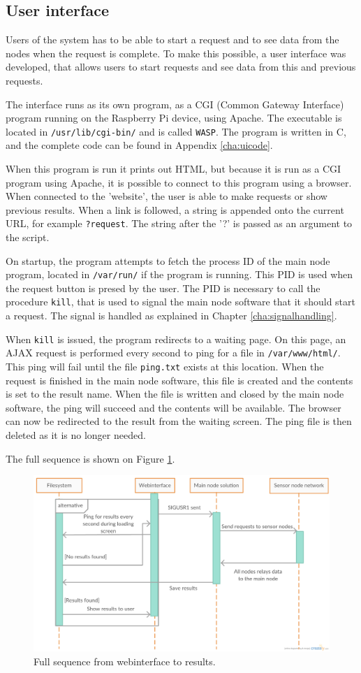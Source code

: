 \subsection{User interface} \label{cha:webinterface}
Users of the system has to be able to start a request and to see data from the nodes when the request is complete. To make this possible, a user interface was developed, that allows users to start requests and see data from this and previous requests.

The interface runs as its own program, as a CGI (Common Gateway Interface) program running on the Raspberry Pi device, using Apache. The executable is located in \texttt{/usr/lib/cgi-bin/} and is called \texttt{WASP}. The program is written in C, and the complete code can be found in Appendix \ref{cha:uicode}.

When this program is run it prints out HTML, but because it is run as a CGI program using Apache, it is possible to connect to this program using a browser. When connected to the 'website', the user is able to make requests or show previous results. When a link is followed, a string is appended onto the current URL, for example \texttt{?request}. The string after the '?' is passed as an argument to the script.

On startup, the program attempts to fetch the process ID of the main node program, located in \texttt{/var/run/} if the program is running. This PID is used when the request button is presed by the user. The PID is necessary to call the procedure \texttt{kill}, that is used to signal the main node software that it should start a request. The signal is handled as explained in Chapter \ref{cha:signalhandling}.

When \texttt{kill} is issued, the program redirects to a waiting page. On this page, an AJAX request is performed every second to ping for a file in \texttt{/var/www/html/}. This ping will fail until the file \texttt{ping.txt} exists at this location. When the request is finished in the main node software, this file is created and the contents is set to the result name. When the file is written and closed by the main node software, the ping will succeed and the contents will be available. The browser can now be redirected to the result from the waiting screen. The ping file is then deleted as it is no longer needed.

The full sequence is shown on Figure \ref{fig:sigsequence}.
\begin{figure}[h!]
\centering
\includegraphics[width=1.1\textwidth]{chapters/implementation/figures/sigsequence.png}
\caption{Full sequence from webinterface to results\cite{creately}.}
\label{fig:sigsequence}
\end{figure}